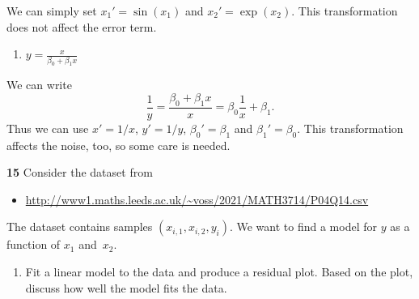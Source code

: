 \documentclass[
  a4paper,
]{article}
\providecommand{\tightlist}{%
  \setlength{\itemsep}{0pt}\setlength{\parskip}{0pt}}
\theoremstyle{definition}
\theoremstyle{definition}
\theoremstyle{definition}
\theoremstyle{definition}
\theoremstyle{remark}
\begin{document}
\begin{myanswers}
We can simply set \(x_1' = \sin(x_1)\) and \(x_2' = \exp(x_2)\).
This transformation does not affect the error term.

\end{myanswers}

\begin{enumerate}
\def\labelenumi{\alph{enumi}.}
\setcounter{enumi}{2}
\tightlist
\item
  \(y = \frac{x}{\beta_0 + \beta_1 x}\)
\end{enumerate}

\begin{myanswers}
We can write
\begin{equation*}
  \frac1y
  = \frac{\beta_0 + \beta_1 x}{x}
  = \beta_0 \frac1x + \beta_1.
\end{equation*}
Thus we can use \(x' = 1/x\), \(y' = 1/y\), \(\beta_0' = \beta_1\) and
\(\beta_1' = \beta_0\). This transformation affects the noise, too,
so some care is needed.

\end{myanswers}

\textbf{15} Consider the dataset from

\begin{itemize}
\tightlist
\item
  \url{http://www1.maths.leeds.ac.uk/~voss/2021/MATH3714/P04Q14.csv}
\end{itemize}

The dataset contains samples \((x_{i,1}, x_{i,2}, y_i)\). We want to
find a model for \(y\) as a function of \(x_1\) and~\(x_2\).

\begin{enumerate}
\def\labelenumi{\alph{enumi}.}
\tightlist
\item
  Fit a linear model to the data and produce a residual plot.
  Based on the plot, discuss how well the model fits the data.
\end{enumerate}
\end{document}
